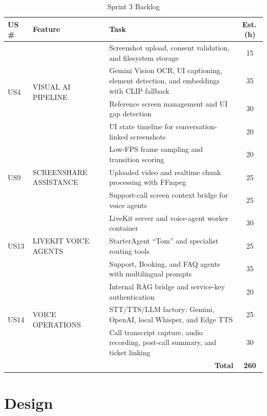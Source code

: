 \begin{table}[H]
\smaller
\centering
\caption{Sprint 3 Backlog}
\label{tab:sprint3-backlog}
\begin{tabular}{|l|p{4.8cm}|p{4.8cm}|c|}
\hline
\textbf{US \#} & \textbf{Feature} & \textbf{Task} & \textbf{Est.\,(h)} \\
\hline
\multirow{4}{*}{US4} & \multirow{4}{*}{\parbox{4.8cm}{VISUAL AI PIPELINE}} & Screenshot upload, consent validation, and filesystem storage & 15 \\
\cline{3-4}
 & & Gemini Vision OCR, UI captioning, element detection, and embeddings with CLIP fallback & 35 \\
\cline{3-4}
 & & Reference screen management and UI gap detection & 30 \\
\cline{3-4}
 & & UI state timeline for conversation-linked screenshots & 20 \\
\hline
\multirow{3}{*}{US9} & \multirow{3}{*}{\parbox{4.8cm}{SCREENSHARE ASSISTANCE}} & Low-FPS frame sampling and transition scoring & 20 \\
\cline{3-4}
 & & Uploaded video and realtime chunk processing with FFmpeg & 25 \\
\cline{3-4}
 & & Support-call screen context bridge for voice agents & 25 \\
\hline
\multirow{3}{*}{US13} & \multirow{3}{*}{\parbox{4.8cm}{LIVEKIT VOICE AGENTS}} & LiveKit server and voice-agent worker container & 30 \\
\cline{3-4}
 & & StarterAgent ``Tom'' and specialist routing tools & 25 \\
\cline{3-4}
 & & Support, Booking, and FAQ agents with multilingual prompts & 35 \\
\hline
\multirow{3}{*}{US14} & \multirow{3}{*}{\parbox{4.8cm}{VOICE OPERATIONS}} & Internal RAG bridge and service-key authentication & 20 \\
\cline{3-4}
 & & STT/TTS/LLM factory: Gemini, OpenAI, local Whisper, and Edge TTS & 25 \\
\cline{3-4}
 & & Call transcript capture, audio recording, post-call summary, and ticket linking & 30 \\
\hline
\multicolumn{3}{|r|}{\textbf{Total}} & \textbf{260} \\
\hline
\end{tabular}
\end{table}

\section{Design}

